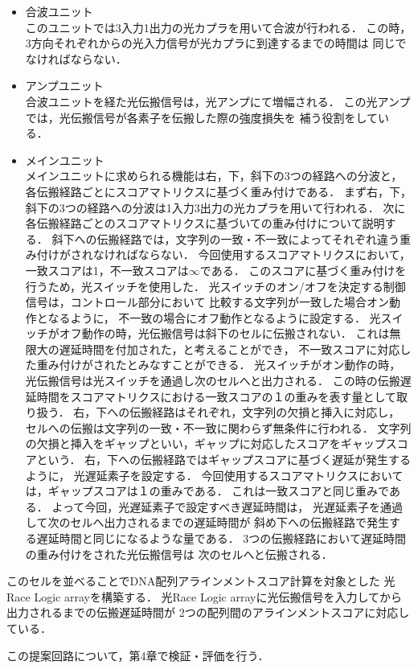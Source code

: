 \begin{itemize}
\item 合波ユニット\\
このユニットでは3入力1出力の光カプラを用いて合波が行われる．
この時，3方向それぞれからの光入力信号が光カプラに到達するまでの時間は
同じでなければならない．
\item アンプユニット\\
合波ユニットを経た光伝搬信号は，光アンプにて増幅される．
この光アンプでは，光伝搬信号が各素子を伝搬した際の強度損失を
補う役割をしている．
\item メインユニット\\
メインユニットに求められる機能は右，下，斜下の3つの経路への分波と，
各伝搬経路ごとにスコアマトリクスに基づく重み付けである．
まず右，下，斜下の3つの経路への分波は1入力3出力の光カプラを用いて行われる．
次に各伝搬経路ごとのスコアマトリクスに基づいての重み付けについて説明する．
斜下への伝搬経路では，文字列の一致・不一致によってそれぞれ違う重み付けがされなければならない．
今回使用するスコアマトリクスにおいて，一致スコアは1，不一致スコアは$\infty$である．
このスコアに基づく重み付けを行うため，光スイッチを使用した．
光スイッチのオン/オフを決定する制御信号は，コントロール部分において
比較する文字列が一致した場合オン動作となるように，
不一致の場合にオフ動作となるように設定する．
光スイッチがオフ動作の時，光伝搬信号は斜下のセルに伝搬されない．
これは無限大の遅延時間を付加された，と考えることができ，
不一致スコアに対応した重み付けがされたとみなすことができる．
光スイッチがオン動作の時，光伝搬信号は光スイッチを通過し次のセルへと出力される．
この時の伝搬遅延時間をスコアマトリクスにおける一致スコアの１の重みを表す量として取り扱う．
右，下への伝搬経路はそれぞれ，文字列の欠損と挿入に対応し，
セルへの伝搬は文字列の一致・不一致に関わらず無条件に行われる．
文字列の欠損と挿入をギャップといい，ギャップに対応したスコアをギャップスコアという．
右，下への伝搬経路ではギャップスコアに基づく遅延が発生するように，
光遅延素子を設定する．
今回使用するスコアマトリクスにおいては，ギャップスコアは１の重みである．
これは一致スコアと同じ重みである．
よって今回，光遅延素子で設定すべき遅延時間は，
光遅延素子を通過して次のセルへ出力されるまでの遅延時間が
斜め下への伝搬経路で発生する遅延時間と同じになるような量である．
3つの伝搬経路において遅延時間の重み付けをされた光伝搬信号は
次のセルへと伝搬される．
\end{itemize}

このセルを並べることでDNA配列アラインメントスコア計算を対象とした
光Race Logic arrayを構築する．
光Race Logic arrayに光伝搬信号を入力してから出力されるまでの伝搬遅延時間が
2つの配列間のアラインメントスコアに対応している．

この提案回路について，第4章で検証・評価を行う．
